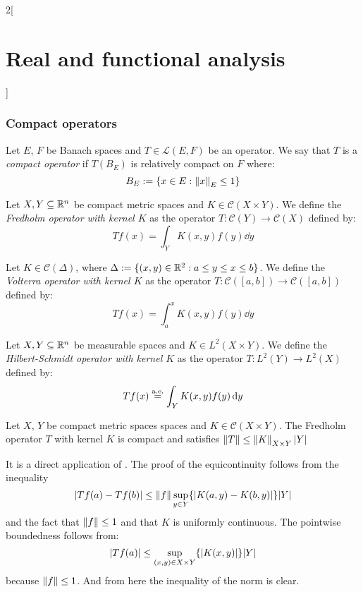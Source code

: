 \documentclass[../../../main_math.tex]{subfiles}
\begin{document}
\begin{multicols}{2}[\section{Real and functional analysis}]
  \subsubsection{Compact operators}
  \begin{definition}
    Let $E$, $F$ be Banach spaces and $T\in\mathcal{L}(E,F)$ be an operator. We say that $T$ is a \emph{compact operator} if $T(B_E)$ is relatively compact on $F$ where: $$B_E:=\{x\in E:\left\|x\right\|_E\leq 1\}$$
  \end{definition}
  \begin{definition}
    Let $X,Y\subseteq \mathbb{R}^n$ be compact metric spaces and $K\in\mathcal{C}(X\times Y)$. We define the \emph{Fredholm operator with kernel $K$} as the operator $T:\mathcal{C}(Y)\rightarrow\mathcal{C}(X)$ defined by: $$Tf(x)=\int_YK(x,y)f(y)\dd{y}$$
  \end{definition}
  \begin{definition}
    Let $K\in\mathcal{C}(\Delta)$, where $\Delta:=\{(x,y)\in\mathbb{R}^2:a\leq y\leq x\leq b\}$. We define the \emph{Volterra operator with kernel $K$} as the operator $T:\mathcal{C}([a,b])\rightarrow\mathcal{C}([a,b])$ defined by: $$Tf(x)=\int_a^xK(x,y)f(y)\dd{y}$$
  \end{definition}
  \begin{definition}
    Let $X,Y\subseteq \mathbb{R}^n$ be measurable spaces and $K\in L^2(X\times Y)$. We define the \emph{Hilbert-Schmidt operator with kernel $K$} as the operator $T:L^2(Y)\rightarrow L^2(X)$ defined by: $$Tf(x)\overset{\text{a.e.}}{=}\int_YK(x,y)f(y)\dd{y}$$
  \end{definition}
  \begin{proposition}\label{RFA:fredholm}
    Let $X$, $Y$ be compact metric spaces spaces and $K\in\mathcal{C}(X\times Y)$. The Fredholm operator $T$ with kernel $K$ is compact and satisfies $\norm{T}\leq\norm{K}_{X\times Y}\m{Y}$
  \end{proposition}
  \begin{sproof}
    It is a direct application of . The proof of the equicontinuity follows from the inequality
    $$\abs{Tf(a)-Tf(b)}\leq \norm{f}\sup_{y\in Y}\{\abs{K(a,y)-K(b,y)}\}\m{Y}$$
    and the fact that $\left\|f\right\|\leq 1$ and that $K$ is uniformly continuous. The pointwise boundedness follows from:
    $$\abs{Tf(a)}\leq\sup_{(x,y)\in X\times Y}\{\abs{K(x,y)}\}\m{Y}$$
    because $\left\|f\right\|\leq 1$.
    And from here the inequality of the norm is clear.
  \end{sproof}
  \begin{proposition}

\end{proposition}
\end{multicols}
\end{document}
